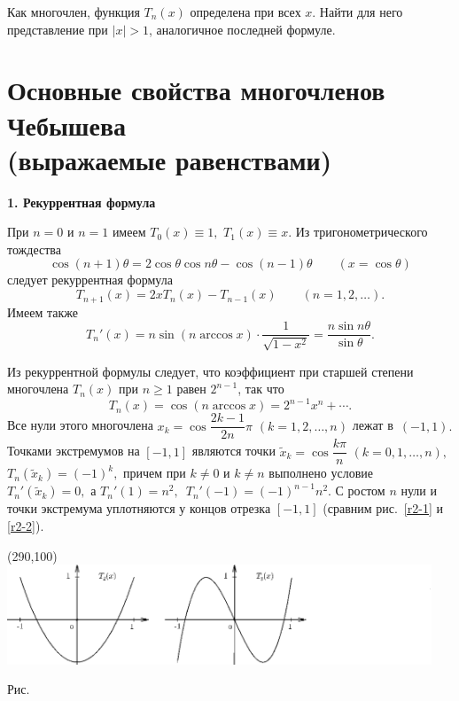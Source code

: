 \begin{ex}
{Как многочлен, функция $T_n(x)$ определена при всех $x$. Найти} {для него
представление при $|x| > 1$, аналогичное последней формуле.}
\end{ex}

\section{Основные свойства многочленов Чебышева \\
(выражаемые равенствами)}

\vspace{-2mm}
{\bf 1. Рекуррентная формула}
\vspace{3mm}

При $n=0$ и $n=1$ имеем $T_0(x) \equiv 1,$ $T_1(x) \equiv x.$ Из тригонометрического тождества
\[
  \cos (n+1)\theta =2 \cos \theta \cos n \theta -\cos (n-1)\theta
  \qquad (x = \cos{\theta})
\]
следует {рекуррентная формула}
\[
  T_{n+1}(x)=2x T_n(x)-T_{n-1}(x) \qquad (n=1,2,\dots ).
\]
{Имеем также}
$$
 {T_n'(x)=n \sin ({n} \arccos{x})\cdot \frac{1}{\sqrt{1-x^2}} = \frac{n\sin
 n\theta}{\sin{\theta}}.}
$$

Из рекуррентной формулы следует, что коэффициент при старшей степени многочлена
{$T_n(x)$ при $n \ge 1$} равен $2^{n-1}$, так что
\[
  T_n(x)=\cos (n \arccos x) =2^{n-1} x^n+\cdots .
\]
Все нули этого многочлена $x_k=\cos \dfrac{2k-1}{2n}\pi$
$(k=1,2,\dots ,n)$ лежат в~$(-1,1).$ {Точками} экстремумов
на $[-1,1]$ являются {точки} $\widetilde x_k=\cos \dfrac{k
\pi}{n}$ {$(k=0,1,\dots ,n),$} $T_n(\widetilde x_k)=(-1)^k,$
причем при {$k\ne 0$} и {$k \ne n$} выполнено {условие
$T_n'(\widetilde x_k) = 0,$ а $T_n'(1)=n^2,$}\
{$T_n'(-1)=(-1)^{n-1}n^2$. С ростом $n$ нули и точки
экстремума уплотняются у концов} {отрезка $[-1,1]$} (сравним
рис.~\ref{r2-1} и \ref{r2-2}).


\begin{center}
\begin{picture}(290,100)
\includegraphics[width=0.95\textwidth]{pict/pict02-1.eps}
\end{picture}
\centerline{\normalsize Рис.~\theris}

\label{r2-1}
\end{center}


